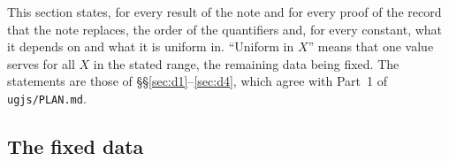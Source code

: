 
This section states, for every result of the note and for every proof of the record that the
note replaces, the order of the quantifiers and, for every constant, what it depends on and
what it is uniform in. ``Uniform in $X$'' means that one value serves for all $X$ in the stated
range, the remaining data being fixed. The statements are those of
\S\S\ref{sec:d1}--\ref{sec:d4}, which agree with Part~1 of \texttt{ugjs/PLAN.md}.

\subsection{The fixed data}\label{sec:quant-fixed}

